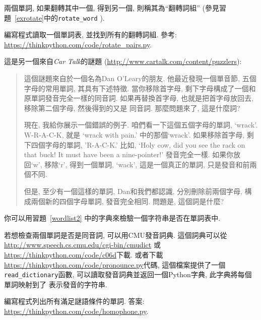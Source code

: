 \documentclass[10pt]{book}
\begin{document}
\begin{exercise}
\label{exrotatepairs}

兩個單詞, 如果翻轉其中一個, 得到另一個, 則稱其為``翻轉詞組''
(參見習題~\ref{exrotate}中的\verb"rotate_word" ).

編寫程式讀取一個單詞表, 並找到所有的翻轉詞組. 
參考: \url{https://thinkpython.com/code/rotate_pairs.py}.

\end{exercise}


\begin{exercise}

這是另一個來自{\em Car Talk}的謎題
(\url{http://www.cartalk.com/content/puzzlers}):

\begin{quote}
這個謎題來自於一個名為Dan O'Leary的朋友. 
他最近發現一個單音節, 五個字母的常用單詞, 其具有下述特徵. 
當你移除首字母, 剩下字母構成了一個和原單詞發音完全一樣的同音詞. 
如果再替換首字母, 也就是把首字母放回去, 移除第二個字母, 然後得到的又是
同音詞. 那麼問題來了, 這是什麼詞?

現在, 我給你展示一個錯誤的例子. 
咱們看一下這個五個字母的單詞, `wrack'.  W-R-A-C-K, 就是
`wrack with pain.' 中的那個`wrack'. 
如果移除首字母, 剩下四個字母的單詞, 'R-A-C-K.' 
比如, `Holy cow, did you see the rack on that buck!
It must have been a nine-pointer!' 發音完全一樣. 
如果你放回`w', 移除`r', 得到一個單詞, `wack', 
這是一個真正的單詞, 只是發音和前兩個不同. 

但是, 至少有一個這樣的單詞, Dan和我們都認識, 
分別刪除前兩個字母, 構成兩個新的四個字母單詞, 發音完全相同. 
問題是, 這個詞是什麼?
\end{quote}

你可以用習題~\ref{wordlist2} 中的字典來檢驗一個字符串是否在單詞表中. 

若想檢查兩個單詞是否是同音詞, 可以用CMU發音詞典. 
這個詞典可以從\url{http://www.speech.cs.cmu.edu/cgi-bin/cmudict}
或\url{https://thinkpython.com/code/c06d}下載. 
或者下載\url{https://thinkpython.com/code/pronounce.py}代碼, 
這個檔案提供了一個 \verb"read_dictionary"函數, 
可以讀取發音詞典並返回一個Python字典, 此字典將每個單詞映射到了
表示發音的字符串. 

編寫程式列出所有滿足謎語條件的單詞. 
答案: \url{https://thinkpython.com/code/homophone.py}.

\end{exercise}
\end{document}
